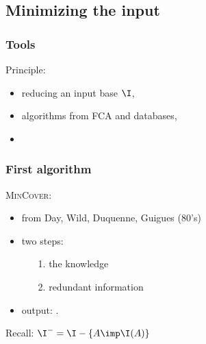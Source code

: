 

\subsection{Minimizing the input}

\begin{frame}
\frametitle{Tools}

Principle:
\begin{itemize}
	\item reducing an input base $\I$,
	
	\vspace{1.2em}
	
	\item algorithms from FCA and databases,
	
	\vspace{1.2em}
	
	\item
\end{itemize}

\end{frame}

\begin{frame}
\frametitle{First algorithm}

\textsc{MinCover}:
\begin{itemize}
	\item from Day, Wild, Duquenne, Guigues (80's)
	
	\vspace{0.8em}
	
	\item two steps:
		\begin{itemize}
			\item[\color{belize} 1.]  the knowledge
			\item[ ] 
			
			\vspace{0.5em}
			
			\item[\color{belize} 2.]  redundant information
			\item[ ] 
		\end{itemize}
	
	\vspace{0.8em}
	
	\item output: .
\end{itemize}

\vspace{1em}

\begin{lightreminder}
	Recall: $\I^{-} = \I - \{ A \imp \I(A) \}$	
\end{lightreminder}

\end{frame}

